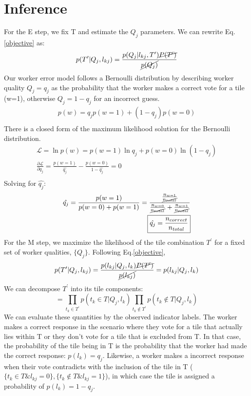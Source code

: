 \documentclass[12pt]{article}
\begin{document}
\section{Inference}
\par For the E step, we fix T and estimate the $Q_j$ parameters. We can rewrite Eq.\ref{objective} as: 
\begin{equation}
p(T^\prime| Q_j,l_{kj})
=\frac{p(Q_j| l_{kj},T^\prime)\cancel{P(T^\prime)}}{\cancel{p(Q_j)}}
\end{equation}
Our worker error model follows a Bernoulli distribution by describing worker quality $Q_j=q_j$ as the probability that the worker makes a correct vote for a tile (w=1), otherwise $Q_j=1-q_j$ for an incorrect guess. 
\begin{align}
p(w)=q_j p(w=1)+(1-q_j)p(w=0) \\
\end{align}
There is a closed form of the maximum likelihood solution for the Bernoulli distribution.
\begin{align}
\mathcal{L}=\ln p(w)=p(w=1)\ln q_j + p(w=0)\ln(1-q_j) \\
\frac{\partial \mathcal{L}}{\partial q_j}=\frac{p(w=1)}{\hat{q_j}}-\frac{p(w=0)}{1-\hat{q_j}}=0\\
\end{align}
Solving for $\hat{q_j}$: 
\begin{align}
\hat{q_j}=\frac{p(w=1)}{p(w=0)+p(w=1)}=\frac{\frac{n_{w=1}}{\cancel{n_{total}}}}{\frac{n_{w=0}}{\cancel{n_{total}}}+\frac{n_{w=1}}{\cancel{n_{total}}}}\\
\boxed{\hat{q_j}=\frac{n_{correct}}{n_{total}}}
\end{align}
For the M step, we maximize the likelihood of the tile combination $T^\prime$ for a fixed set of worker qualities, $\{Q_j\}$. Following Eq.\ref{objective}, 
\begin{equation}
p(T^\prime| Q_j,l_{kj})
=\frac{p(l_{kj}|Q_j,l_k)\cancel{P(T^\prime)}}{\cancel{p(l_{kj})}}=p(l_{kj}|Q_j,l_k)
\end{equation}
We can decompose $T^\prime$ into its tile components: 
\begin{equation}
=\prod_{t_k\in T^\prime} p(t_k\in T|Q_j,l_k)\prod_{t_k\notin T^\prime} p(t_k\notin T|Q_j,l_k)
\end{equation}
We can evaluate these quantities by the observed indicator labels. The worker makes a correct response in the scenario where they vote for a tile that actually lies within T or they don't vote for a tile that is excluded from T. In that case, the probability of the tile being in T is the probability that the worker had made the correct response: $p(l_k) = q_j$. Likewise, a worker makes a incorrect response when their vote contradicts with the inclusion of the tile in T ($\{t_k\in T \& l_{kj}=0\}, \{t_k\notin T \& l_{kj}=1\}$), in which case the tile is assigned a probability of $p(l_k)=1-q_j$.
\end{document}
